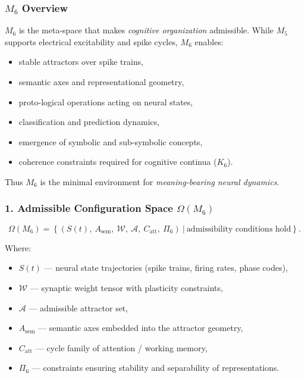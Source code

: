 

\subsubsection{\texorpdfstring{$M_6$}{M_6} Overview}
\label{sec:m6-overview}

$M_6$ is the meta-space that makes \emph{cognitive organization} admissible.
While $M_5$ supports electrical excitability and spike cycles, $M_6$ enables:

\begin{itemize}
    \item stable attractors over spike trains,
    \item semantic axes and representational geometry,
    \item proto-logical operations acting on neural states,
    \item classification and prediction dynamics,
    \item emergence of symbolic and sub-symbolic concepts,
    \item coherence constraints required for cognitive continua ($K_6$).
\end{itemize}

Thus $M_6$ is the minimal environment for \emph{meaning-bearing neural dynamics}.

\subsubsection*{1. Admissible Configuration Space \texorpdfstring{$\Omega(M_6)$}{\Omega(M_6)}}

\[
\Omega(M_6) =
\left\{
(S(t),\ A_{\mathrm{sem}},\ 
\mathcal{W},\ 
\mathcal{A},\ 
C_{\mathrm{att}},\
\Pi_6)
\ \big|\ \text{admissibility conditions hold}
\right\}.
\]

Where:

\begin{itemize}
    \item $S(t)$ — neural state trajectories (spike trains, firing rates, phase codes),
    \item $\mathcal{W}$ — synaptic weight tensor with plasticity constraints,
    \item $\mathcal{A}$ — admissible attractor set,
    \item $A_{\mathrm{sem}}$ — semantic axes embedded into the attractor geometry,
    \item $C_{\mathrm{att}}$ — cycle family of attention / working memory,
    \item $\Pi_6$ — constraints ensuring stability and separability of representations.
\end{itemize}


